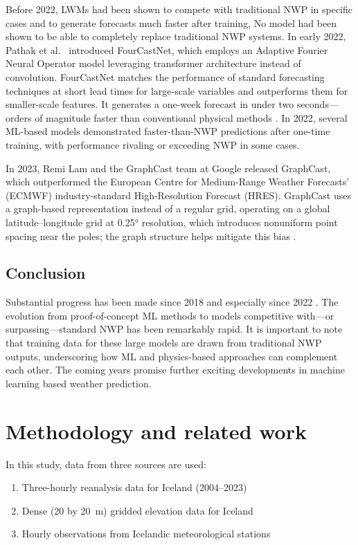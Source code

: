 Before 2022, LWMs had been shown to compete with traditional NWP in specific cases and to generate forecasts much faster after training, No model had been shown to be able to completely replace traditional NWP systems. In early 2022, Pathak et al.\ \cite{FourCastNet} introduced FourCastNet, which employs an Adaptive Fourier Neural Operator model leveraging transformer architecture instead of convolution. FourCastNet matches the performance of standard forecasting techniques at short lead times for large-scale variables and outperforms them for smaller-scale features. It generates a one-week forecast in under two seconds—orders of magnitude faster than conventional physical methods \cite{FourCastNet}. In 2022, several ML-based models demonstrated faster-than-NWP predictions after one-time training, with performance rivaling or exceeding NWP in some cases.

In 2023, Remi Lam and the GraphCast team at Google released GraphCast, which outperformed the European Centre for Medium-Range Weather Forecasts’ (ECMWF) industry-standard High-Resolution Forecast (HRES). GraphCast uses a graph-based representation instead of a regular grid, operating on a global latitude–longitude grid at 0.25° resolution, which introduces nonuniform point spacing near the poles; the graph structure helps mitigate this bias \cite{GraphCast}.

\subsection{Conclusion}
Substantial progress has been made since 2018 and especially since 2022 \cite{SecondRevolution}. The evolution from proof-of-concept ML methods to models competitive with—or surpassing—standard NWP has been remarkably rapid. It is important to note that training data for these large models are drawn from traditional NWP outputs, underscoring how ML and physics-based approaches can complement each other. The coming years promise further exciting developments in machine learning based weather prediction.

\section{Methodology and related work}\label{sec:methodology}

In this study, data from three sources are used:

\begin{enumerate}[label=\textbf{\arabic*}.,rightmargin=1.5em]
  \item Three-hourly reanalysis data for Iceland (2004–2023)
  \item Dense (20 by 20~m) gridded elevation data for Iceland
  \item Hourly observations from Icelandic meteorological stations
\end{enumerate}


